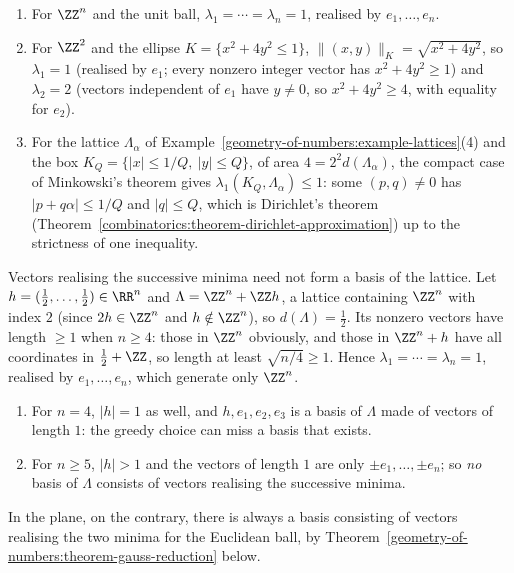 \begin{example}\label{geometry-of-numbers:example-successive-minima}
\begin{enumerate}
\item For $\ZZ^n$ and the unit ball, $\lambda_1 = \cdots = \lambda_n = 1$, realised by $e_1, \ldots, e_n$.
\item For $\ZZ^2$ and the ellipse $K = \{x^2 + 4y^2 \leq 1\}$, $\|(x, y)\|_K = \sqrt{x^2 + 4y^2}$, so $\lambda_1 = 1$ (realised by $e_1$; every nonzero integer vector has $x^2 + 4y^2 \geq 1$) and
$\lambda_2 = 2$ (vectors independent of $e_1$ have $y \neq 0$, so $x^2 + 4y^2 \geq 4$, with equality for $e_2$).
\item For the lattice $\Lambda_\alpha$ of Example~\ref{geometry-of-numbers:example-lattices}(4) and the box $K_Q = \{|x| \leq 1/Q, \ |y| \leq Q\}$, of area $4 = 2^2d(\Lambda_\alpha)$, the
compact case of Minkowski's theorem gives $\lambda_1(K_Q, \Lambda_\alpha) \leq 1$: some $(p, q) \neq 0$ has $|p + q\alpha| \leq 1/Q$ and $|q| \leq Q$, which is Dirichlet's theorem
(Theorem~\ref{combinatorics:theorem-dirichlet-approximation}) up to the strictness of one inequality.
\end{enumerate}
\end{example}

\begin{counterexample}\label{geometry-of-numbers:counterexample-minima-basis}
Vectors realising the successive minima need not form a basis of the lattice. Let $h = (\frac12, \ldots, \frac12) \in \RR^n$ and $\Lambda = \ZZ^n + \ZZ h$, a lattice containing $\ZZ^n$ with index $2$
(since $2h \in \ZZ^n$ and $h \notin \ZZ^n$), so $d(\Lambda) = \frac12$. Its nonzero vectors have length $\geq 1$ when $n \geq 4$: those in $\ZZ^n$ obviously, and those in $\ZZ^n + h$ have all coordinates
in $\frac12 + \ZZ$, so length at least $\sqrt{n/4} \geq 1$. Hence $\lambda_1 = \cdots = \lambda_n = 1$, realised by $e_1, \ldots, e_n$, which generate only $\ZZ^n$.
\begin{enumerate}
\item For $n = 4$, $|h| = 1$ as well, and $h, e_1, e_2, e_3$ is a basis of $\Lambda$ made of vectors of length $1$: the greedy choice can miss a basis that exists.
\item For $n \geq 5$, $|h| > 1$ and the vectors of length $1$ are only $\pm e_1, \ldots, \pm e_n$; so \emph{no} basis of $\Lambda$ consists of vectors realising the successive minima.
\end{enumerate}
In the plane, on the contrary, there is always a basis consisting of vectors realising the two minima for the Euclidean ball, by Theorem~\ref{geometry-of-numbers:theorem-gauss-reduction} below.
\end{counterexample}

